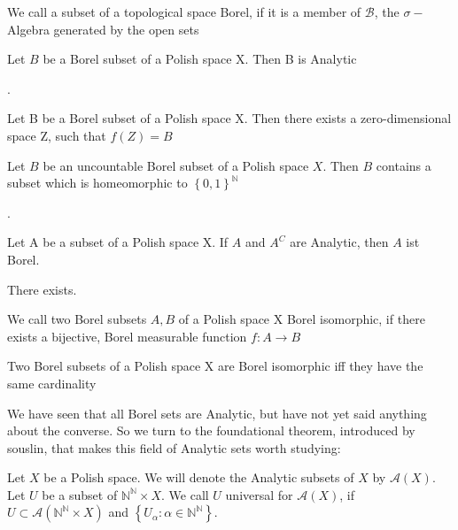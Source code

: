 \documentclass[10pt, a4paper, titlepage]{article}
\numberwithin{equation}{section}
\begin{document}
\begin{definition}
	We call a subset of a topological space Borel, if it is a member of $\mathcal{B}$, the $\sigma-$Algebra generated by the open sets
\end{definition}


\begin{theorem}
	Let $B$ be a Borel subset of a Polish space X. Then B is Analytic		
\end{theorem}


\begin{definition}
	.	
\end{definition}

\begin{theorem}
	Let B be a Borel subset of a Polish space X. Then there exists a zero-dimensional space Z, such that $f(Z) = B$
\end{theorem}

\begin{theorem}
	Let $B$ be an uncountable Borel subset of a Polish space  $X$. Then  $B$ contains a subset which is homeomorphic to  $\left\{ 0,1 \right\}^\mathbb{N}$
	
\end{theorem}


\begin{theorem}
	.
\end{theorem}


\begin{theorem}
	Let A be a subset of a Polish space X. If $A$ and  $A^{C}$ are Analytic, then $A$ ist Borel.  
\end{theorem}


\begin{theorem}
	There exists.
\end{theorem}

\begin{definition}
	We call two Borel subsets $A,B$ of a Polish space X Borel isomorphic, if there exists a bijective, Borel measurable function $f: A \to B$
\end{definition}


\begin{theorem}
	Two Borel subsets of a Polish space X are Borel isomorphic iff they have the same cardinality
\end{theorem}

We have seen that all Borel sets are Analytic, but have not yet said anything about the converse. So we turn to the foundational theorem, introduced by souslin, that makes this field of Analytic sets worth studying:
\begin{definition}
Let $X$ be a Polish space. 
We will denote the Analytic subsets of $X$ by $\mathcal{A}\left( X \right) $. 
Let $U$ be a subset of $\mathbb{N}^\mathbb{N} \times X $. 
We call $U$ universal for  $\mathcal{A}\left( X \right) $, if $U \subset \mathcal{A}\left( \mathbb{N}^\mathbb{N} \times X \right) $ and $\left\{ U_{\alpha}\colon \alpha \in \mathbb{N}^\mathbb{N} \right\} $. 
\end{definition}
\end{document}

